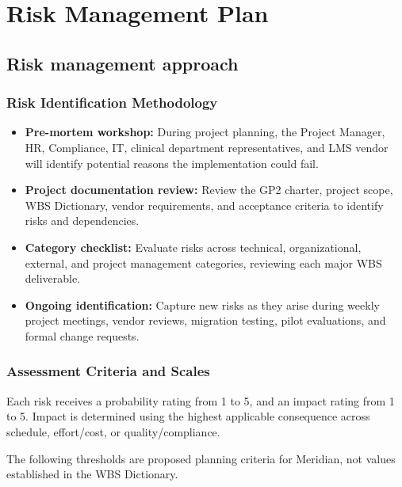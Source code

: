 
\clearpage
\section{Risk Management Plan}\label{sec:4}
\subsection{Risk management approach}\label{sec:4.1}
\subsubsection{Risk Identification Methodology}\label{sec:risk-identification-methodology}
\begin{itemize}
\item \textbf{Pre-mortem workshop:} During project planning, the Project Manager, HR, Compliance, IT, clinical department representatives, and LMS vendor will identify potential reasons the implementation could fail.
\item \textbf{Project documentation review:} Review the GP2 charter, project scope, WBS Dictionary, vendor requirements, and acceptance criteria to identify risks and dependencies.
\item \textbf{Category checklist:} Evaluate risks across technical, organizational, external, and project management categories, reviewing each major WBS deliverable.
\item \textbf{Ongoing identification:} Capture new risks as they arise during weekly project meetings, vendor reviews, migration testing, pilot evaluations, and formal change requests.
\end{itemize}


\subsubsection{Assessment Criteria and Scales}\label{sec:assessment-criteria-and-scales}
Each risk receives a probability rating from 1 to 5, and an impact rating from 1 to 5. Impact is determined using the highest applicable consequence across schedule, effort/\allowbreak{}cost, or quality/\allowbreak{}compliance.


The following thresholds are proposed planning criteria for Meridian, not values established in the WBS Dictionary.


